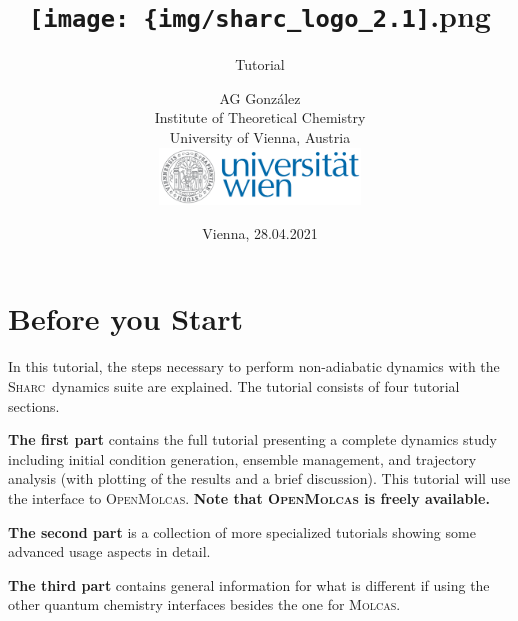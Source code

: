 \documentclass[a4paper,11pt,DIV=15,openany]{scrbook}
\title{\hspace{1cm}\texttt{[image: \{img/sharc\_logo\_2.1]}.png}\\[0.5cm]
\subtitle{Tutorial\\[1cm]}
\date{Vienna, 28.04.2021}
\author{AG Gonz\'alez\\
Institute of Theoretical Chemistry\\
University of Vienna, Austria
\vspace{1cm}
\\
\includegraphics[width=0.4\textwidth,keepaspectratio=true]{img/univie.pdf}}
\newcommand{\link}[2]{\href{#1}{#2}}
\newcommand{\sharc}{\textsc{Sharc}}
\newcommand{\todo}[1]{\textcolor{RL}{#1}}
\begin{document}
\tpage


\newpage
{}
\ohead{\leftmark\quad {\normalfont|} \quad\rightmark}
\ofoot[\pagemark]{\pagemark}


\tableofcontents


\chapter{Before you Start}

In this tutorial, the steps necessary to perform non-adiabatic dynamics with the \sharc\ dynamics suite are explained. 
The tutorial consists of four tutorial sections. 

\textbf{The first part} contains the full tutorial presenting a complete dynamics study including initial condition generation, ensemble management, and trajectory analysis (with plotting of the results and a brief discussion). 
This tutorial will use the interface to \textsc{OpenMolcas}.
\textbf{Note that \textsc{OpenMolcas} is freely available.}

\textbf{The second part} is a collection of more specialized tutorials showing some advanced usage aspects in detail.

\textbf{The third part} contains general information for what is different if using the other quantum chemistry interfaces besides the one for \textsc{Molcas}.
\end{document}
